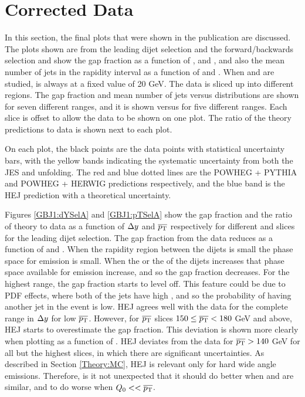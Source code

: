 \section{Corrected Data}
\label{sec:GBJ1:FinalPlots}

In this section, the final plots that were shown in the publication are discussed. 
The plots shown are from  the leading \pt{} dijet selection and the forward/backwards selection and show the gap fraction as a function of \dy{}, \ptb{} and \qz{}, and also the mean number of jets in the rapidity interval as a function of \dy{} and \ptb{}. 
When \dy{} and \ptb{} are studied, \qz{} is always at a fixed value of 20 GeV. 
The data is sliced up into different regions. 
The gap fraction and mean number of jets versus \dy{} distributions are shown for seven different \ptb{} ranges, and it is shown versus \ptb{} for five different \dy{} ranges. 
Each slice is offset to allow the data to be shown on one plot. 
The ratio of the theory predictions to data is shown next to each plot.

On each plot, the black points are the data points with statistical uncertainty bars, with the yellow bands indicating the systematic uncertainty from both the JES and unfolding. 
The red and blue dotted lines are the POWHEG + PYTHIA and POWHEG + HERWIG predictions respectively, and the blue band is the HEJ prediction with a theoretical uncertainty.

Figures \ref{GBJ1:dYSelA} and \ref{GBJ1:pTSelA} show the gap fraction and the ratio of theory to data as a function of $\mbox{$\Delta y$}{}$ and $\mbox{$\overline{p_{\rm T}}$}{}$ respectively for different \ptb{} and \dy{} slices for the leading \pt{} dijet selection. 
The gap fraction from the data reduces as a function of \ptb{} and \dy{}.
When the rapidity region between the dijets is small the phase space for emission is small. 
When the \dy{} or the \ptb{} of the dijets increases that phase space available for emission increase, and so the gap fraction decreases.
For the highest \ptb{} range, the gap fraction starts to level off. 
This feature could be due to PDF effects, where both of the jets have high \pt{}, and so the probability of having another jet in the event is low.
HEJ agrees well with the data for the complete range in $\mbox{$\Delta y$}$ for low $\mbox{$\overline{p_{\rm T}}$}{}$. 
However, for $\mbox{$\overline{p_{\rm T}}$}{}$ slices $150\le\mbox{$\overline{p_{\rm T}}$}{}<180$ GeV and above, HEJ starts to overestimate the gap fraction.
This deviation is shown more clearly when plotting as a function of \ptb{}.
HEJ deviates from the data for $\mbox{$\overline{p_{\rm T}}$}{}>140$ GeV for all but the highest \dy{} slices, in which there are significant uncertainties.
As described in Section \ref{Theory:MC}, HEJ is relevant only for hard wide angle emissions.
Therefore, is it not unexpected that it should do better when \qz{} and \ptb{} are similar, and to do worse when $Q_{0}<<\mbox{$\overline{p_{\rm T}}$}{}$.

